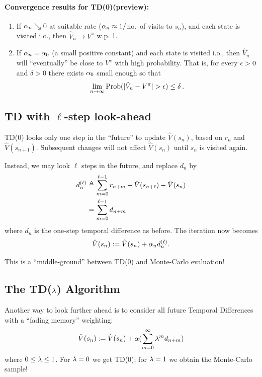 \paragraph{Convergence results for TD(0)\quad (preview):}
\begin{enumerate}
\item
If $\alpha_n \searrow 0 $ at suitable rate ($\alpha_n \approx 1/$no.~of visits to
$s_n$), and each state is visited i.o., then
$\hat V_n \to V^{\pi}$ w.p. 1.

\item
If $\alpha_n= \alpha_0$ (a small positive constant) and each state is visited i.o.,
then $\hat V_n$ will ``eventually'' be close to $V^{\pi}$ with high probability.
That is, for every $\epsilon>0$ and $\delta>0$ there exists $\alpha_0$ small enough so that
$$
\lim_{n\to\infty}
\mbox{\rm Prob}(|\hat V_n - V^{\pi} | > \epsilon) \le \delta \,.
$$
\end{enumerate}

\subsection{TD with $\ell$-step look-ahead}

TD(0) looks only one step in the ``future'' to update $\hat V(s_n)$,
based on $r_n$ and $\hat V(s_{n+1})$.  Subsequent changes will not affect $\hat
V(s_n)$ until $s_n$ is visited again.

Instead, we may look $\ell$ steps in the future, and replace $d_n$ by
\begin{align*}
d_n^{(\ell)} & \triangleq \sum_{m=0}^{\ell-1} r_{n+m} + \hat
V(s_{n+\ell}) -
\hat V(s_n) \\
& = \sum_{m=0}^{\ell-1} d_{n+m}
\end{align*}
where $d_n$ is the one-step temporal difference as before.
The iteration now becomes
$$\hat V(s_n) := \hat V(s_n) + \alpha_n d_n^{(\ell)}.$$

This is a ``middle-ground'' between TD(0) and Monte-Carlo evaluation!


\subsection{The TD($\lambda$) Algorithm}

Another way to look further ahead is to consider all future Temporal
Differences with a ``fading memory'' weighting:
\begin{equation}
\label{*}
\hat V(s_n) := \hat V(s_n) + \alpha ( \sum_{m=0}^\infty \lambda^m d_{n+m} )
\end{equation}
where $0 \le \lambda \le 1$.
For $\lambda=0$ we get TD(0); for $\lambda=1$ we obtain the Monte-Carlo sample!

